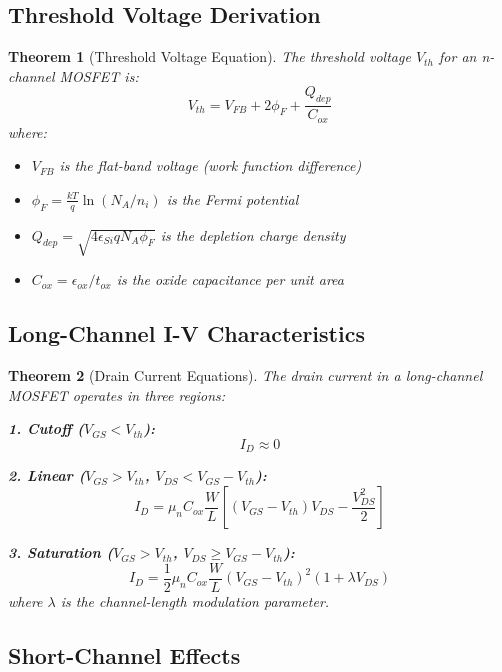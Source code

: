 \documentclass[a4paper, 11pt]{article}
\newtheorem{theorem}{Theorem}[section]
\begin{document}
\subsection{Threshold Voltage Derivation}

\begin{theorem}[Threshold Voltage Equation]
The threshold voltage $V_{th}$ for an n-channel MOSFET is:
\begin{equation}
V_{th} = V_{FB} + 2\phi_F + \frac{Q_{dep}}{C_{ox}}
\end{equation}
where:
\begin{itemize}
\item $V_{FB}$ is the flat-band voltage (work function difference)
\item $\phi_F = \frac{kT}{q}\ln(N_A/n_i)$ is the Fermi potential
\item $Q_{dep} = \sqrt{4\epsilon_{Si}qN_A\phi_F}$ is the depletion charge density
\item $C_{ox} = \epsilon_{ox}/t_{ox}$ is the oxide capacitance per unit area
\end{itemize}
\end{theorem}

\subsection{Long-Channel I-V Characteristics}

\begin{theorem}[Drain Current Equations]
The drain current in a long-channel MOSFET operates in three regions:

\textbf{1. Cutoff ($V_{GS} < V_{th}$):}
\begin{equation}
I_D \approx 0
\end{equation}

\textbf{2. Linear ($V_{GS} > V_{th}$, $V_{DS} < V_{GS} - V_{th}$):}
\begin{equation}
I_D = \mu_n C_{ox} \frac{W}{L} \left[(V_{GS} - V_{th})V_{DS} - \frac{V_{DS}^2}{2}\right]
\end{equation}

\textbf{3. Saturation ($V_{GS} > V_{th}$, $V_{DS} \geq V_{GS} - V_{th}$):}
\begin{equation}
I_D = \frac{1}{2}\mu_n C_{ox} \frac{W}{L}(V_{GS} - V_{th})^2(1 + \lambda V_{DS})
\end{equation}
where $\lambda$ is the channel-length modulation parameter.
\end{theorem}

\subsection{Short-Channel Effects}
\end{document}
